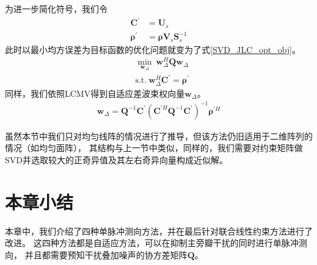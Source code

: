 \documentclass[master]{thesis-uestc}
\begin{document}
为进一步简化符号，我们令
\begin{subequations}
    \begin{align}
        \bm{C}^\prime &= \bm{U}_s \\
        \bm{\rho}^\prime &= \bm{\rho}\bm{V}_s\bm{S}_s^{-1}
    \end{align}
\end{subequations}
此时以最小均方误差为目标函数的优化问题就变为了式\eqref{SVD_JLC_opt_obj}。
\begin{equation}\label{SVD_JLC_opt_obj}
    \begin{aligned}
        &\min_{\bm{w}_\Delta} ~ \bm{w}^H_\Delta\bm{Q}\bm{w}_{\Delta} \\
        &\text{s.t.} ~ \bm{w}^H_\Delta\bm{C}^\prime = \bm{\rho}^\prime
    \end{aligned}
\end{equation}
同样，我们依照LCMV得到自适应差波束权向量$\bm{w}_\Delta$。
\begin{equation}
    \begin{aligned}
        \bm{w}_{\Delta} = \bm{Q}^{-1}\bm{C}^\prime
        \left(\bm{C}^{\prime H}\bm{Q}^{-1}\bm{C}^\prime\right)^{-1}\bm{\rho}^{\prime H}
    \end{aligned}
\end{equation}

虽然本节中我们只对均匀线阵的情况进行了推导，但该方法仍旧适用于二维阵列的情况（如均匀面阵），
其结构与上一节中类似，同样的，我们需要对约束矩阵做SVD并选取较大的正奇异值及其左右奇异向量构成近似解。

\section{本章小结}
本章中，我们介绍了四种单脉冲测向方法，并在最后针对联合线性约束方法进行了改进。
这四种方法都是自适应方法，可以在抑制主旁瓣干扰的同时进行单脉冲测向，
并且都需要预知干扰叠加噪声的协方差矩阵$\bm{Q}$。
\end{document}
